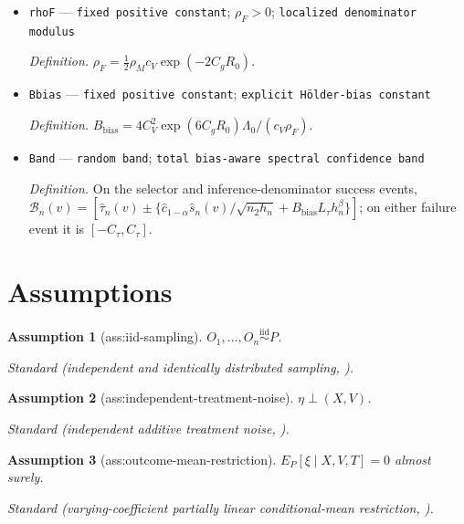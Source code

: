 \documentclass{article}
\newtheorem{assumption}{Assumption}
\begin{document}
\begin{itemize}
  \item \texttt{rhoF} --- \texttt{fixed positive constant}; \(\rho_F>0\); \texttt{localized denominator modulus}
  \par\smallskip\noindent\emph{Definition.} \(\rho_F=\tfrac12\rho_Mc_V\exp(-2C_gR_0)\).
  \item \texttt{Bbias} --- \texttt{fixed positive constant}; \texttt{explicit Hölder-\allowbreak{}bias constant}
  \par\smallskip\noindent\emph{Definition.} \(B_{\mathrm{bias}}=4C_V^2\exp(6C_gR_0)\Lambda_0/(c_V\rho_F)\).
  \item \texttt{Band} --- \texttt{random band}; \texttt{total bias-\allowbreak{}aware spectral confidence band}
  \par\smallskip\noindent\emph{Definition.} On the selector and inference-denominator success events, \(\mathcal B_n(v)=[\widehat\tau_n(v)\pm\{\widehat c_{1-\alpha}\widehat s_n(v)/\sqrt{n_2h_n}+B_{\mathrm{bias}}L_\tau h_n^\beta\}]\); on either failure event it is \([-C_\tau,C_\tau]\).
\end{itemize}

\section{Assumptions}

\begin{assumption}[ass:iid-sampling]\label{ass:iid-sampling}
\(O_1,\ldots,O_n\stackrel{\mathrm{iid}}{\sim}P\).
\par\smallskip\noindent\emph{Standard} (independent and identically distributed sampling, \cite{ChernozhukovChetverikovKato2014}).
\end{assumption}

\begin{assumption}[ass:independent-treatment-noise]\label{ass:independent-treatment-noise}
\(\eta\perp(X,V)\).
\par\smallskip\noindent\emph{Standard} (independent additive treatment noise, \cite{JinMackeySyrgkanis2025}).
\end{assumption}

\begin{assumption}[ass:outcome-mean-restriction]\label{ass:outcome-mean-restriction}
\(E_P[\xi\mid X,V,T]=0\) almost surely.
\par\smallskip\noindent\emph{Standard} (varying-coefficient partially linear conditional-mean restriction, \cite{FanZhang2000}).
\end{assumption}
\end{document}
